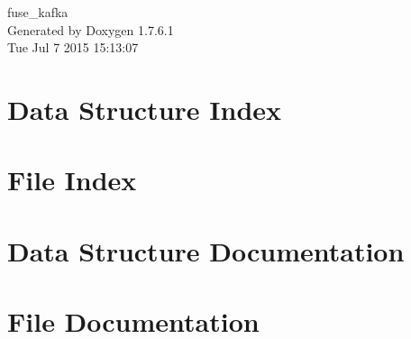 \documentclass[a4paper]{book}
\begin{document}
\hypersetup{pageanchor=false,citecolor=blue}
\begin{titlepage}
\vspace*{7cm}
\begin{center}
{\Large fuse\-\_\-kafka }\\
\vspace*{1cm}
{\large \-Generated by Doxygen 1.7.6.1}\\
\vspace*{0.5cm}
{\small Tue Jul 7 2015 15:13:07}\\
\end{center}
\end{titlepage}
\clearemptydoublepage
{}
\tableofcontents
\clearemptydoublepage
{}
\hypersetup{pageanchor=true,citecolor=blue}
\chapter{\-Data \-Structure \-Index}

\chapter{\-File \-Index}

\chapter{\-Data \-Structure \-Documentation}




















\chapter{\-File \-Documentation}








\printindex
\end{document}
